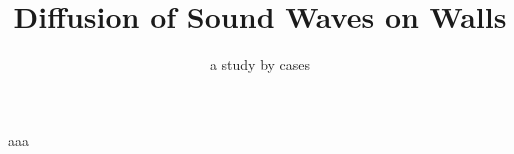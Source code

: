 \documentclass[compress]{beamer}
\title[]{Diffusion of Sound Waves on Walls}
\subtitle{a study by cases}
\author[]{}
\institute[]{}
\date{}
\begin{document}
\begin{frame}[plain]
  \titlepage
\end{frame}

\begin{frame}
  \frametitle{}
  \framesubtitle{}
aaa
\end{frame}
\end{document}
